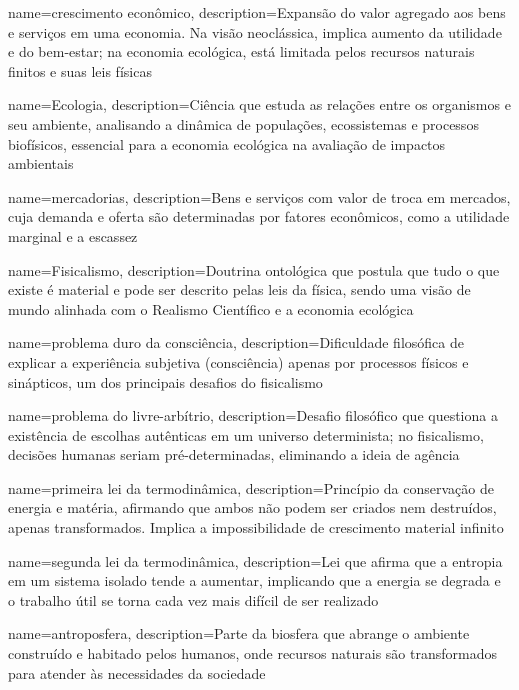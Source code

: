 {
	name=crescimento econômico,
	description={Expansão do valor agregado aos bens e serviços em uma economia. Na visão neoclássica, implica aumento da utilidade e do bem-estar; na economia ecológica, está limitada pelos recursos naturais finitos e suas leis físicas}
}

{
	name=Ecologia,
	description={Ciência que estuda as relações entre os organismos e seu ambiente, analisando a dinâmica de populações, ecossistemas e processos biofísicos, essencial para a economia ecológica na avaliação de impactos ambientais}
}

{
	name=mercadorias,
	description={Bens e serviços com valor de troca em mercados, cuja demanda e oferta são determinadas por fatores econômicos, como a utilidade marginal e a escassez}
}

{
	name=Fisicalismo,
	description={Doutrina ontológica que postula que tudo o que existe é material e pode ser descrito pelas leis da física, sendo uma visão de mundo alinhada com o Realismo Científico e a economia ecológica}
}

{
	name=problema duro da consciência,
	description={Dificuldade filosófica de explicar a experiência subjetiva (consciência) apenas por processos físicos e sinápticos, um dos principais desafios do fisicalismo}
}

{
	name=problema do livre-arbítrio,
	description={Desafio filosófico que questiona a existência de escolhas autênticas em um universo determinista; no fisicalismo, decisões humanas seriam pré-determinadas, eliminando a ideia de agência}
}

{
	name=primeira lei da termodinâmica,
	description={Princípio da conservação de energia e matéria, afirmando que ambos não podem ser criados nem destruídos, apenas transformados. Implica a impossibilidade de crescimento material infinito}
}

{
	name=segunda lei da termodinâmica,
	description={Lei que afirma que a entropia em um sistema isolado tende a aumentar, implicando que a energia se degrada e o trabalho útil se torna cada vez mais difícil de ser realizado}
}

{
	name=antroposfera,
	description={Parte da biosfera que abrange o ambiente construído e habitado pelos humanos, onde recursos naturais são transformados para atender às necessidades da sociedade}
}

